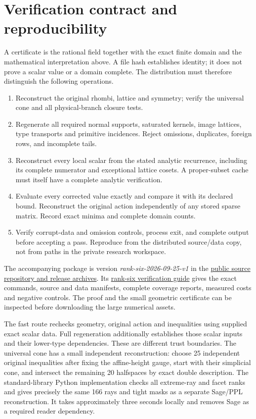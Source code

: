 \documentclass[11pt]{article}
\theoremstyle{definition}\newtheorem{definition}[theorem]{Definition}
\theoremstyle{remark}\newtheorem{remark}[theorem]{Remark}
\begin{document}
\section{Verification contract and reproducibility}\label{sec:verification}
A certificate is the rational field together with the exact finite domain
and the mathematical interpretation above. A file hash establishes identity;
it does not prove a scalar value or a domain complete. The distribution must
therefore distinguish the following operations.
\begin{enumerate}
\item Reconstruct the original rhombi, lattice and symmetry; verify the
universal cone and all physical-branch closure tests.
\item Regenerate all required normal supports, saturated kernels, image
lattices, type transports and primitive incidences. Reject omissions,
duplicates, foreign rows, and incomplete tails.
\item Reconstruct every local scalar from the stated analytic recurrence,
including its complete numerator and exceptional lattice cosets. A
proper-subset cache must itself have a complete analytic verification.
\item Evaluate every corrected value exactly and compare it with its
declared bound. Reconstruct the original action independently of any
stored sparse matrix. Record exact minima and complete domain counts.
\item Verify corrupt-data and omission controls, process exit, and complete
output before accepting a pass. Reproduce from the distributed source/data
copy, not from paths in the private research workspace.
\end{enumerate}

The accompanying package is version \emph{rank-six-2026-09-25-v1} in the
\href{https://github.com/chris-hadad/lr-stretching-results/releases/tag/rank-six-2026-09-25-v1}{public source
repository and release archives}. Its
\href{https://github.com/chris-hadad/lr-stretching-results/blob/rank-six-2026-09-25-v1/results/rank-six-positivity/VERIFYING.md}{rank-six verification guide}
gives the exact commands, source and data manifests, complete coverage reports,
measured costs and negative controls. The proof and the small geometric
certificate can be inspected before downloading the large numerical assets.

The fast route rechecks geometry, original action and inequalities using
supplied exact scalar data. Full regeneration additionally establishes those
scalar inputs and their lower-type dependencies. These are different trust
boundaries. The universal cone has a small independent reconstruction: choose
25 independent original inequalities after fixing the affine-height gauge,
start with their simplicial cone, and intersect the remaining 20 halfspaces
by exact double description. The standard-library Python implementation
checks all extreme-ray and facet ranks and gives precisely the same 166 rays
and tight masks as a separate Sage/PPL reconstruction. It takes approximately
three seconds locally and removes Sage as a required reader dependency.
\end{document}
